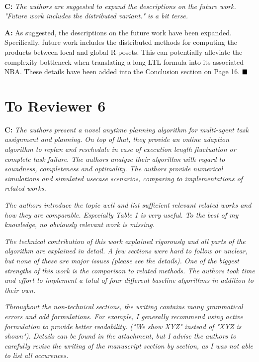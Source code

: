 \documentclass[10pt]{article}
\begin{document}
\hspace*{\fill} \


\textbf{C:}
\emph{
	The authors are suggested to expand the descriptions on the future
	work. "Future work includes the distributed variant." is a bit terse.
}

\textbf{A:} As suggested, the descriptions on the future
work have been expanded.  Specifically, future work includes the distributed methods for computing
	the products between local and global R-posets.
	This can potentially alleviate the complexity bottleneck
	when translating a long LTL formula into its associated NBA.
These details have been added into the Conclusion section on Page 16.
$\hfill\blacksquare$




\newpage
\section*{To Reviewer 6}

\textbf{C:}
\emph{
The authors present a novel anytime planning algorithm for multi-agent
task assignment and planning. On top of that, they provide an online
adaption algorithm to replan and reschedule in case of execution length
fluctuation or complete task failure. The authors analyze their
algorithm with regard to soundness, completeness and optimality. The
authors provide numerical simulations and simulated usecase scenarios,
comparing to implementations of related works.}

\emph{
The authors introduce the topic well and list sufficient relevant
related works and how they are comparable. Especially Table 1 is very
useful. To the best of my knowledge, no obviously relevant work is
missing.}

\emph{
The technical contribution of this work explained rigorously and all
parts of the algorithm are explained in detail. A few sections were
hard to follow or unclear, but none of these are major issues (please
see the details). One of the biggest strengths of this work is the
comparison to related methods. The authors took time and effort to
implement a total of four different baseline algorithms in addition to
their own.}

\emph{
Throughout the non-technical sections, the writing contains many
grammatical errors and odd formulations. For example, I generally
recommend using active formulation to provide better readability. ("We
show XYZ" instead of "XYZ is shown"). Details can be found in the
attachment, but I advise the authors to carefully revise the writing of
the manuscript section by section, as I was not able to list all
occurences. }
\end{document}
